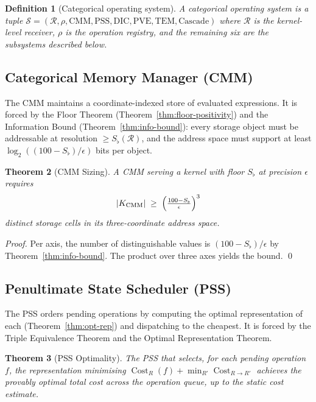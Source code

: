 \documentclass[twocolumn,a4paper]{article}
\newtheorem{theorem}{Theorem}[section]
\newtheorem{definition}[theorem]{Definition}
\DeclareMathOperator{\Conv}{Cost}
\newcommand{\receiver}{\mathcal{R}}
\newcommand{\Sfloor}{S_{\flat}}
\begin{document}
\begin{definition}[Categorical operating system]
\label{def:cos}
A \emph{categorical operating system} is a tuple $\mathcal{S}=(\receiver,\rho,\mathrm{CMM},\mathrm{PSS},\mathrm{DIC},\mathrm{PVE},\mathrm{TEM},\mathrm{Cascade})$ where $\receiver$ is the kernel-level receiver, $\rho$ is the operation registry, and the remaining six are the subsystems described below.
\end{definition}

\subsection{Categorical Memory Manager (CMM)}

The CMM maintains a coordinate-indexed store of evaluated expressions. It is forced by the Floor Theorem (Theorem~\ref{thm:floor-positivity}) and the Information Bound (Theorem~\ref{thm:info-bound}): every storage object must be addressable at resolution $\geq\Sfloor(\receiver)$, and the address space must support at least $\log_{2}((100-\Sfloor)/\epsilon)$ bits per object.

\begin{theorem}[CMM Sizing]
\label{thm:cmm-sizing}
A CMM serving a kernel with floor $\Sfloor$ at precision $\epsilon$ requires
\[
|K_{\mathrm{CMM}}|\;\geq\;\Bigl(\tfrac{100-\Sfloor}{\epsilon}\Bigr)^{3}
\]
distinct storage cells in its three-coordinate address space.
\end{theorem}

\begin{proof}
Per axis, the number of distinguishable values is $(100-\Sfloor)/\epsilon$ by Theorem~\ref{thm:info-bound}. The product over three axes yields the bound. \qed
\end{proof}

\subsection{Penultimate State Scheduler (PSS)}

The PSS orders pending operations by computing the optimal representation of each (Theorem~\ref{thm:opt-rep}) and dispatching to the cheapest. It is forced by the Triple Equivalence Theorem and the Optimal Representation Theorem.

\begin{theorem}[PSS Optimality]
\label{thm:pss-opt}
The PSS that selects, for each pending operation $f$, the representation minimising $\Conv_{R}(f)+\min_{R'}\Conv_{R\to R'}$ achieves the provably optimal total cost across the operation queue, up to the static cost estimate.
\end{theorem}
\end{document}
